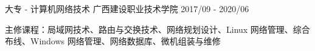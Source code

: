

\begin{cventries}

  \cventry
    {大专 - 计算机网络技术} %
    {广西建设职业技术学院} %
    {} %
    {2017/09 - 2020/06} %
    {
      \begin{cvitems} %
        \item {主修课程：局域网技术、路由与交换技术、网络规划设计、Linux 网络管理、综合布线、Windows 网络管理、网络数据库、微机组装与维修}
      \end{cvitems}
    }

\end{cventries}

